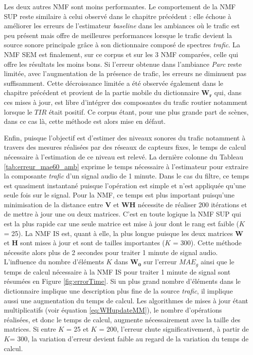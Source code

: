 Les deux autres NMF sont moins performantes.
Le comportement de la NMF SUP reste similaire à celui observé dans le chapitre précédent : elle échoue à améliorer les erreurs de l'estimateur \textit{baseline} dans les ambiances où le trafic est peu présent mais offre de meilleures performances lorsque le trafic devient la source sonore principale grâce à son dictionnaire composé de spectres \textit{trafic}.
La NMF SEM est finalement, sur ce corpus et sur les 3 NMF comparées, celle qui offre les résultats les moins bons. Si l'erreur obtenue dans l'ambiance \textit{Parc} reste limitée, avec l'augmentation de la présence de trafic, les erreurs ne diminuent pas suffisamment. Cette décroissance limitée a été observée également dans le chapitre précédent et provient de la partie mobile du dictionnaire $\mathbf{W_r}$ qui, dans ces mises à jour, est libre d'intégrer des composantes du trafic routier notamment lorsque le $TIR$ était positif. Ce corpus étant, pour une plus grande part de scènes, dans ce cas là, cette méthode est alors mise en défaut. 

Enfin, puisque l'objectif est d'estimer des niveaux sonores du trafic notamment à travers des mesures réalisées par des réseaux de capteurs fixes, le temps de calcul nécessaire à l'estimation de ce niveau est relevé. La dernière colonne du Tableau \ref{tab:erreur_mae60_amb} exprime le temps nécessaire à l'estimateur pour extraire la composante \textit{trafic} d'un signal audio de 1 minute. Dans le cas du filtre, ce temps est quasiment instantané puisque l'opération est simple et n'est appliquée qu'une seule fois sur le signal.
Pour la NMF, ce temps est plus important puisqu'une minimisation de la distance entre $\mathbf{V}$ et $\mathbf{WH}$ nécessite de réaliser 200  itérations et de mettre à jour une ou deux matrices. C'est en toute logique la NMF SUP qui est la plus rapide car une seule matrice est mise à jour dont le rang est faible ($K$ = 25).
La NMF IS est, quant à elle, la plus longue puisque les deux matrices $\mathbf{W}$ et $\mathbf{H}$ sont mises à jour et sont de tailles importantes ($K$ = 300). Cette méthode nécessite alors plus de 2 secondes pour traiter 1 minute de signal audio. L'influence du nombre d'éléments $K$ dans $\mathbf{W_0}$ sur l'erreur $MAE_g$ ainsi que le temps de calcul nécessaire à la NMF IS pour traiter 1 minute de signal sont résumées en Figure \ref{fig:errorTime}. Si un plus grand nombre d'éléments dans le dictionnaire implique une description plus fine de la source \textit{trafic}, il implique aussi une augmentation du temps de calcul. Les algorithmes de mises à jour étant multiplicatifs (voir équation \ref{eq:WHupdateMM}), le nombre d'opérations réalisées, et donc le temps de calcul, augmente nécessairement avec la taille des matrices. Si entre $K$ = 25 et $K$ = 200, l'erreur chute significativement, à partir de $K$= 300, la variation d'erreur devient faible au regard de la variation du temps de calcul. 

